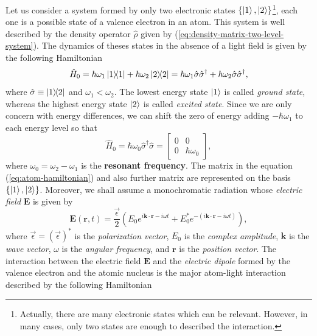 Let us consider a system formed by only two electronic states $ \{\ket{1}, \ket{2}\} $\footnote{Actually, there are many electronic states which can be relevant. However, in many cases, only two states are enough to described the interaction.}, each one is a possible state of a valence electron in an atom. This system is well described by the density operator $ \hat{\rho} $ given by (\ref{eq:density-matrix-two-level-system}). The dynamics of theses states in the absence of a light field is given by the following Hamiltonian
\begin{equation}
	 \hat{H}_0 = \hbar \omega_1 \ketbra{1}{1} + \hbar \omega_2 \ketbra{2}{2} = \hbar \omega_1 \hat{\sigma} \hat{\sigma}^{\dagger} + \hbar \omega_2 \hat{\sigma} \hat{\sigma}^{\dagger},
\end{equation}
where $ \hat{\sigma} \equiv \ketbra{1}{2} $ and $ \omega_1 < \omega_2 $. The lowest energy state $ \ket{1} $ is called \textit{ground state}, whereas the highest energy state $ \ket{2} $ is called \textit{excited state}. Since we are only concern with energy differences, we can shift the zero of energy adding $ - \hbar \omega_1 $ to each energy level so that
\begin{equation}
	\hat{H}_0 = \hbar \omega_0 \hat{\sigma}^{\dagger} \hat{\sigma} = \left[ \begin{matrix} 0 & 0 \\ 0 & \hbar \omega_0 \end{matrix} \right],
	\label{eq:atom-hamiltonian}
\end{equation}
where $ \omega_0 = \omega_2 - \omega_1 $ is the \textbf{resonant frequency}. The matrix in the equation (\ref{eq:atom-hamiltonian}) and also further matrix are represented on the basis $ \{\ket{1}, \ket{2}\} $. Moreover, we shall assume a monochromatic radiation whose \textit{electric field} $ \mathbf{E} $ is given by
\begin{equation}
	\mathbf{E}(\mathbf{r}, t) = \frac{\vec{\epsilon}}{2}(E_0 e^{i \mathbf{k} \cdot \mathbf{r} - i \omega t} + E_0^* e^{-(i \mathbf{k} \cdot \mathbf{r} - i \omega t)}),
	\label{eq:monochromatic-radiation}
\end{equation}
where $ \vec{\epsilon} = (\vec{\epsilon})^* $ is the \textit{polarization vector}, $ E_0 $ is the \textit{complex amplitude}, $ \mathbf{k} $ is the \textit{wave vector}, $ \omega $ is the \textit{angular frequency}, and $ \mathbf{r} $ is the \textit{position vector}. The interaction between the electric field $ \mathbf{E} $ and the \textit{electric dipole} formed by the valence electron and the atomic nucleus is the major atom-light interaction described by the following Hamiltonian
